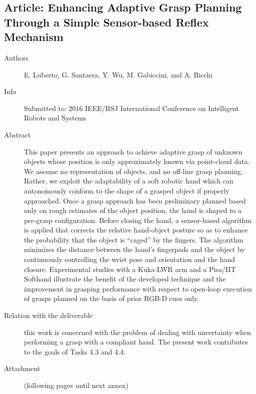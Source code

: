 \documentclass[a4paper,11pt,pdf]{pacmanreport}
\begin{document}

\subsection{Article: Enhancing Adaptive Grasp Planning Through a Simple Sensor-based Reflex Mechanism}
\label{ann:IRSensorBasedGraspPlanning}
\begin{description}
    \item[Authors] E. Luberto, G. Santaera, Y. Wu, M. Gabiccini, and A. Bicchi
    \item[Info] Submitted to: 2016 IEEE/RSJ International Conference on Intelligent Robots and Systems
    \item[Abstract] This paper presents an approach to achieve
adaptive grasp of unknown objects whose position is only
approximately known via point-cloud data. We assume no
representation of objects, and no off-line grasp planning.
Rather, we exploit the adaptability of a soft robotic hand
which can autonomously conform to the shape of a grasped
object if properly approached. Once a grasp approach has
been preliminary planned based only on rough estimates of the
object position, the hand is shaped to a pre-grasp configuration.
Before closing the hand, a sensor-based algorithm is applied
that corrects the relative hand-object posture so as to enhance
the probability that the object is “caged” by the fingers. The
algorithm minimizes the distance between the hand’s fingerpads
and the object by continuously controlling the wrist pose and
orientation and the hand closure. Experimental studies with a
Kuka-LWR arm and a Pisa/IIT Softhand illustrate the benefit
of the developed technique and the improvement in grasping
performance with respect to open-loop execution of grasps
planned on the basis of prior RGB-D cues only.
    \item[Relation with the deliverable] this work is concerned with the problem of dealing with uncertainty when performing a grasp with a compliant hand. The present work contributes to the goals of Tasks 4.3 and 4.4.
    \item[Attachment] (following pages until next annex)
\end{description}


\end{document}
